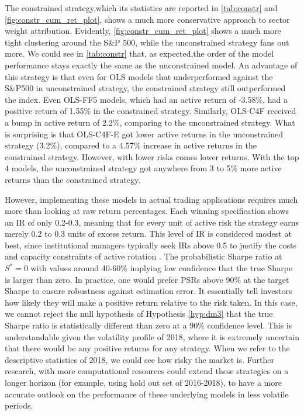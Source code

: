 The constrained strategy,which its statistics are reported in \cref{tab:constr} and \cref{fig:constr_cum_ret_plot}, shows a much more conservative approach to sector weight attribution. Evidently, \cref{fig:constr_cum_ret_plot} shows a much more tight clustering around the S\&P 500, while the unconstrained strategy fans out more. We could see in \cref{tab:constr} that, as expected,the order of the model performance stays exactly the same as the unconstrained model. An advantage of this strategy is that even for OLS models that underperformed against the S\&P500 in unconstrained strategy, the constrained strategy still outperformed the index. Even OLS-FF5 models, which had an active return of -3.58\%, had a positive return of 1.55\% in the constrained strategy. Similarly, OLS-C4F received a bump in active return of 2.2\%, comparing to the unconstrained strategy. What is surprising is that OLS-C4F-E got lower active returns in the unconstrained strategy (3.2\%), compared to a 4.57\% increase in active returns in the constrained strategy. However, with lower risks comes lower returns. With the top 4 models, the unconstrained strategy got anywhere from 3 to 5\% more active returns than the constrained strategy.

However, implementing these models in actual trading applications requires much more than looking at raw return percentages. Each winning specification shows an IR of only 0.2-0.3, meaning that for every unit of active risk the strategy earns merely 0.2 to 0.3 units of excess return. This level of IR is considered modest at best, since institutional managers typically seek IRs above 0.5 to justify the costs and capacity constraints of active rotation \cite{gratton_2025}. The probabilistic Sharpe ratio at $S^{*} = 0$  with values around 40-60\% implying low confidence that the true Sharpe is larger than zero. In practice, one would prefer PSRs above 90\% at the target Sharpe to ensure robustness against estimation error. It essentially tell investors how likely they will make a positive return relative to the risk taken. In this case, we cannot reject the null hypothesis of Hypothesis \ref{hyp:dm3} that the true Sharpe ratio is statistically different than zero at a 90\% confidence level. This is understandable given the volatility profile of 2018, where it is extremely uncertain that there would be any positive returns for any strategy. When we refer to the descriptive statistics of 2018, we could see how risky the market is.  Further research, with more computational resources could extend these strategies on a longer horizon (for example, using hold out set of 2016-2018), to have a more accurate outlook on the performance of these underlying models in less volatile periods.



